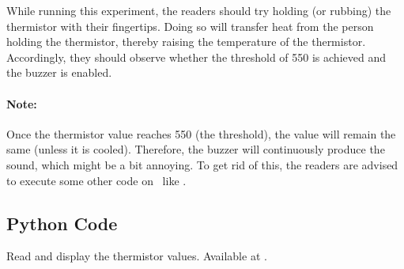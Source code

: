 \begin{enumerate}
        While running this experiment,
        the readers should try holding (or rubbing) the thermistor with their fingertips.
        Doing so will transfer heat from the person holding the
        thermistor, thereby raising the temperature of the thermistor.
        Accordingly, they should observe whether the threshold of 550 is achieved
        and the buzzer is enabled.

        \paragraph{Note:} Once the thermistor value reaches 550 (the threshold), the value will remain the same
        (unless it is cooled). Therefore, the buzzer will continuously produce the sound, which might be
        a bit annoying. To get rid of this, the readers are advised to
        execute some other code on \arduino\ like .

\end{enumerate}

\subsection{Python Code}
\label{sec:therm-pyhton-code}

\begin{pycode}
   {Read and display
    the thermistor values.  Available at
    .}
  \label{py:therm-read}
  
\end{pycode}

